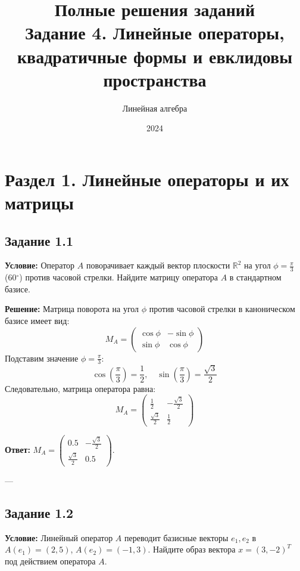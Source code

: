\documentclass[11pt, a4paper]{article}
\title{\textbf{Полные решения заданий}\\ \large Задание 4. Линейные операторы, квадратичные формы и евклидовы пространства}
\author{Линейная алгебра}
\date{2024}
\begin{document}
\maketitle

\section{Раздел 1. Линейные операторы и их матрицы}

\subsection*{Задание 1.1}
\textbf{Условие:} Оператор $A$ поворачивает каждый вектор плоскости $\mathbb{R}^2$ на угол $\phi = \frac{\pi}{3}$ (60$^\circ$) против часовой стрелки. Найдите матрицу оператора $A$ в стандартном базисе.

\textbf{Решение:}
Матрица поворота на угол $\phi$ против часовой стрелки в каноническом базисе имеет вид:
$$ M_A = \begin{pmatrix} \cos\phi & -\sin\phi \\ \sin\phi & \cos\phi \end{pmatrix} $$
Подставим значение $\phi = \frac{\pi}{3}$:
$$ \cos\left(\frac{\pi}{3}\right) = \frac{1}{2}, \quad \sin\left(\frac{\pi}{3}\right) = \frac{\sqrt{3}}{2} $$
Следовательно, матрица оператора равна:
$$ M_A = \begin{pmatrix} \frac{1}{2} & -\frac{\sqrt{3}}{2} \\ \frac{\sqrt{3}}{2} & \frac{1}{2} \end{pmatrix} $$

\textbf{Ответ:} $M_A = \begin{pmatrix} 0.5 & -\frac{\sqrt{3}}{2} \\ \frac{\sqrt{3}}{2} & 0.5 \end{pmatrix}$.

---

\subsection*{Задание 1.2}
\textbf{Условие:} Линейный оператор $A$ переводит базисные векторы $e_1, e_2$ в $A(e_1) = (2, 5)$, $A(e_2) = (-1, 3)$. Найдите образ вектора $x = (3, -2)^T$ под действием оператора $A$.
\end{document}

